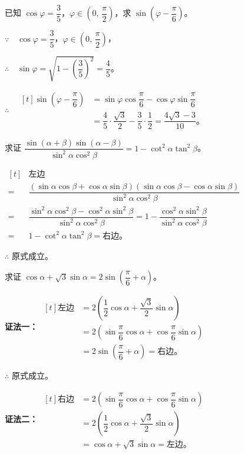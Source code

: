 \jiange
\liti 已知 $\cos\varphi = \dfrac 3 5$，$\varphi \in \left( 0, \, \dfrac \pi 2 \right)$，求 $\sin\left( \varphi - \dfrac \pi 6 \right)$。

\jiange
\jie $\because \quad \cos\varphi = \dfrac 3 5$，$\varphi \in \left( 0, \, \dfrac \pi 2 \right)$，
\jiange

$\therefore \quad \sin\varphi = \sqrt{1 - \left( \dfrac 3 5 \right)^2} = \dfrac 4 5$。
\jiange

$\therefore \quad \begin{aligned}[t]
    \sin\left( \varphi - \dfrac \pi 6 \right) &= \sin\varphi \cos\dfrac \pi 6 - \cos\varphi \sin\dfrac \pi 6 \\
        &= \dfrac 4 5 \cdot \dfrac{\sqrt 3}{2} - \dfrac 3 5 \cdot \dfrac 1 2 = \dfrac{4\sqrt 3 - 3}{10} \text{。}
\end{aligned}$

\jiange
\liti 求证 $\dfrac{\sin(\alpha + \beta) \sin(\alpha - \beta)}{\sin^2 \alpha \cos^2 \beta} = 1 - \cot^2 \alpha \tan^2 \beta$。

\zhengming $\begin{aligned}[t]
      & \text{左边} \\
    = & \dfrac{(\sin\alpha \cos\beta + \cos\alpha \sin\beta)(\sin\alpha \cos\beta - \cos\alpha \sin\beta)}{\sin^2 \alpha \cos^2 \beta} \\
    = & \dfrac{\sin^2 \alpha \cos^2 \beta - \cos^2 \alpha \sin^2 \beta}{\sin^2 \alpha \cos^2 \beta} = 1 - \dfrac{\cos^2 \alpha \sin^2 \beta}{\sin^2 \alpha \cos^2 \beta} \\
    = & 1 - \cot^2 \alpha \tan^2 \beta = \text{右边。}
\end{aligned}$

$\therefore$ \quad 原式成立。

\liti 求证 $\cos\alpha + \sqrt 3 \sin\alpha = 2\sin\left( \dfrac \pi 6 + \alpha \right)$。

\textbf{证法一：} $\begin{aligned}[t]
    \text{左边} &= 2\left( \dfrac 1 2 \cos\alpha + \dfrac{\sqrt 3}{2} \sin\alpha \right) \\
        &= 2\left( \sin\dfrac \pi 6 \cos\alpha + \cos\dfrac \pi 6 \sin\alpha \right) \\
        &= 2\sin\left( \dfrac \pi 6 + \alpha \right) = \text{右边。}
\end{aligned}$

$\therefore$ \quad 原式成立。

\textbf{证法二：} $\begin{aligned}[t]
    \text{右边} &= 2\left( \sin\dfrac \pi 6 \cos\alpha + \cos \dfrac \pi 6 \sin\alpha \right) \\
        &= 2\left( \dfrac 1 2 \cos\alpha + \dfrac{\sqrt 3}{2} \sin\alpha \right) \\
        &= \cos\alpha + \sqrt 3 \sin\alpha = \text{左边。}
\end{aligned}$

